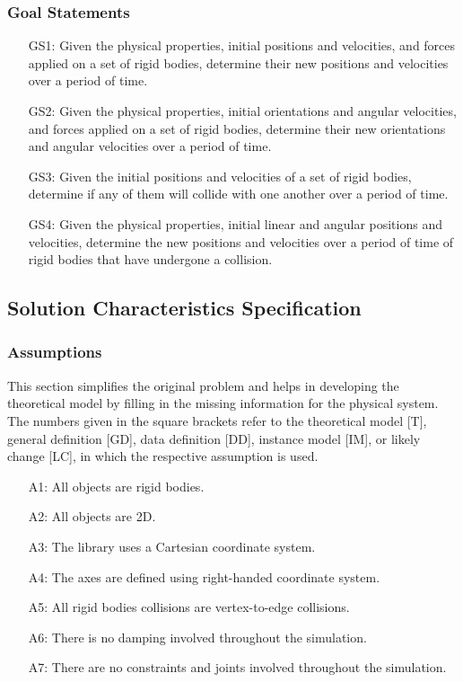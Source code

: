 \documentclass[12pt]{article}
\begin{document}
\subsubsection{Goal Statements}
\label{Sec:GSs}
\begin{itemize}
\item[GS1:]Given the physical properties, initial positions and velocities, and forces applied on a set of rigid bodies, determine their new positions and velocities over a period of time.
\item[GS2:]Given the physical properties, initial orientations and angular velocities, and forces applied on a set of rigid bodies, determine their new orientations and angular velocities over a period of time.
\item[GS3:]Given the initial positions and velocities of a set of rigid bodies, determine if any of them will collide with one another over a period of time.
\item[GS4:]Given the physical properties, initial linear and angular positions and velocities, determine the new positions and velocities over a period of time of rigid bodies that have undergone a collision.
\end{itemize}
\subsection{Solution Characteristics Specification}
\label{Sec:SCS}
\subsubsection{Assumptions}
\label{Sec:As}
This section simplifies the original problem and helps in developing the theoretical model by filling in the missing information for the physical system. The numbers given in the square brackets refer to the theoretical model [T], general definition [GD], data definition [DD], instance model [IM], or likely change [LC], in which the respective assumption is used.
\begin{itemize}
\item[A1:]All objects are rigid bodies.
\item[A2:]All objects are 2D.
\item[A3:]The library uses a Cartesian coordinate system.
\item[A4:]The axes are defined using right-handed coordinate system.
\item[A5:]All rigid bodies collisions are vertex-to-edge collisions.
\item[A6:]There is no damping involved throughout the simulation.
\item[A7:]There are no constraints and joints involved throughout the simulation.
\end{itemize}
\end{document}
